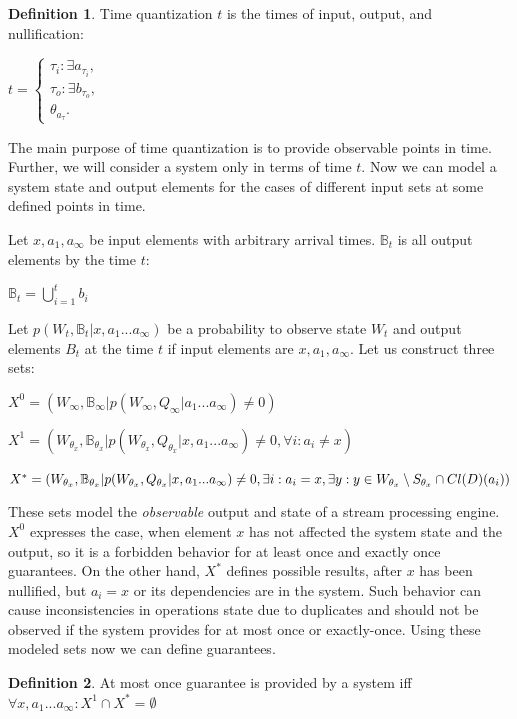 \documentclass[sigconf]{acmart}
\theoremstyle{definition}
\newtheorem{definition}{Definition}
\begin{document}
\begin{definition}{Time quantization}
$t$ is the times of input, output, and nullification:

$t=\begin{cases}
\tau_i:\exists{a_{\tau_i}}, \\
\tau_o:\exists{b_{\tau_o}}, \\
\theta_{a_\tau}.
\end{cases}$
\end{definition}

The main purpose of time quantization is to provide observable points in time. Further, we will consider a system only in terms of time $t$. Now we can model a system state and output elements for the cases of different input sets at some defined points in time. 

Let $x,a_1,a_\infty$ be input elements with arbitrary arrival times. $\mathbb{B}_t$ is all output elements by the time $t$:

$\mathbb{B}_t=\bigcup\limits_{i=1}^{t}{b_i}$

Let $p(W_t,\mathbb{B}_t|x,a_1...a_\infty)$ be a probability to observe state $W_t$ and output elements $B_t$ at the time $t$ if input elements are $x,a_1,a_\infty$. Let us construct three sets:

$X^0=(W_\infty,\mathbb{B}_\infty|p(W_\infty,Q_\infty|a_1...a_\infty)\neq{0})$

$X^1=(W_{\theta_{x}},\mathbb{B}_{\theta_{x}}|p(W_{\theta_{x}},Q_{\theta_{x}}|x,a_1...a_\infty)\neq{0},\forall{i}:{a_i}\neq{x})$

$X^{*}=(W_{\theta_{x}},\mathbb{B}_{\theta_{x}}|p(W_{\theta_{x}},Q_{\theta_{x}}|x,a_1...a_\infty)\neq{0},\\
\exists{i}:{a_i={x}},\exists{y:y\in{W_{\theta_{x}}\setminus{S_{\theta_x}}}\cap{Cl(D)(a_i)}})$

These sets model the {\em observable} output and state of a stream processing engine. $X^0$ expresses the case, when element $x$ has not affected the system state and the output, so it is a forbidden behavior for at least once and exactly once guarantees. On the other hand, $X^{*}$ defines possible results, after $x$ has been nullified, but $a_i=x$ or its dependencies are in the system. Such behavior can cause inconsistencies in operations state due to duplicates and should not be observed if the system provides for at most once or exactly-once. Using these modeled sets now we can define guarantees.

\begin{definition}{At most once}
guarantee is provided by a system iff $\forall{x,a_1...a_\infty}:X^{1}\cap{X^{*}}=\emptyset$
\end{definition}
\end{document}
